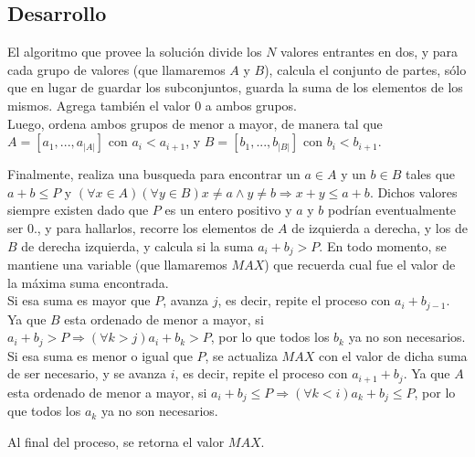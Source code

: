 \subsection{Desarrollo}
El algoritmo que provee la solución divide los $N$ valores entrantes en dos, y para cada grupo de valores (que llamaremos $A$ y $B$), calcula el conjunto de partes, sólo que en lugar de guardar los subconjuntos, guarda la suma de los elementos de los mismos. Agrega también el valor $0$ a ambos grupos.\\
Luego, ordena ambos grupos de menor a mayor, de manera tal que $A = [a_{1},...,a_{\vert A\vert}]$ con $a_{i} < a_{i+1}$, y $B = [b_{1},...,b_{\vert B\vert}]$ con $b_{i} < b_{i+1}$.\par
Finalmente, realiza una busqueda para encontrar un $a \in A$ y un $b \in B$ tales que $a + b \leq P$ y $(\forall x \in A)(\forall y \in B) x \neq a \wedge y \neq b \Rightarrow x + y \leq a + b$. Dichos valores siempre existen dado que $P$ es un entero positivo y $a$ y $b$ podrían eventualmente ser $0$., y para hallarlos, recorre los elementos de $A$ de izquierda a derecha, y los de $B$ de derecha izquierda, y calcula si la suma $a_{i} + b_{j} > P$. En todo momento, se mantiene una variable (que llamaremos $MAX$) que recuerda cual fue el valor de la máxima suma encontrada.\\
Si esa suma es mayor que $P$, avanza $j$, es decir, repite el proceso con $a_{i} + b_{j-1}$. Ya que $B$ esta ordenado de menor a mayor, si $a_{i} + b_{j} > P \Rightarrow (\forall k > j) a_{i}+b_{k} > P$, por lo que todos los $b_{k}$ ya no son necesarios.\\
Si esa suma es menor o igual que $P$, se actualiza $MAX$ con el valor de dicha suma de ser necesario, y se avanza $i$, es decir, repite el proceso con $a_{i+1} + b_{j}$. Ya que $A$ esta ordenado de menor a mayor, si $a_{i} + b_{j} \leq P \Rightarrow (\forall k < i) a_{k}+b_{j} \leq P$, por lo que todos los $a_{k}$ ya no son necesarios.\par
Al final del proceso, se retorna el valor $MAX$.

